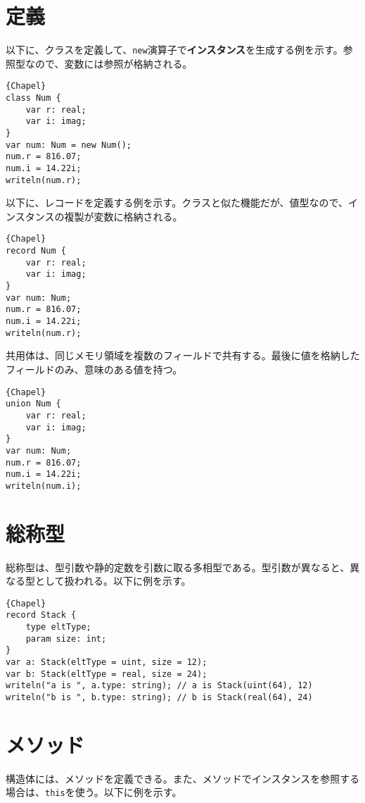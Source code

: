 \documentclass[10pt,a4paper]{book}
\begin{document}
\section{定義}

以下に、クラスを定義して、\texttt{new}演算子で\textbf{インスタンス}を生成する例を示す。参照型なので、変数には参照が格納される。

\begin{Verbatim}{Chapel}
class Num {
	var r: real;
	var i: imag;
}
var num: Num = new Num();
num.r = 816.07;
num.i = 14.22i;
writeln(num.r);
\end{Verbatim}

以下に、レコードを定義する例を示す。クラスと似た機能だが、値型なので、インスタンスの複製が変数に格納される。

\begin{Verbatim}{Chapel}
record Num {
	var r: real;
	var i: imag;
}
var num: Num;
num.r = 816.07;
num.i = 14.22i;
writeln(num.r);
\end{Verbatim}

共用体は、同じメモリ領域を複数のフィールドで共有する。最後に値を格納したフィールドのみ、意味のある値を持つ。

\begin{Verbatim}{Chapel}
union Num {
	var r: real;
	var i: imag;
}
var num: Num;
num.r = 816.07;
num.i = 14.22i;
writeln(num.i);
\end{Verbatim}

\section{総称型}

総称型は、型引数や静的定数を引数に取る多相型である。型引数が異なると、異なる型として扱われる。以下に例を示す。

\begin{Verbatim}{Chapel}
record Stack {
	type eltType;
	param size: int;
}
var a: Stack(eltType = uint, size = 12);
var b: Stack(eltType = real, size = 24);
writeln("a is ", a.type: string); // a is Stack(uint(64), 12)
writeln("b is ", b.type: string); // b is Stack(real(64), 24)
\end{Verbatim}

\section{メソッド}

構造体には、メソッドを定義できる。また、メソッドでインスタンスを参照する場合は、\texttt{this}を使う。以下に例を示す。
\end{document}
